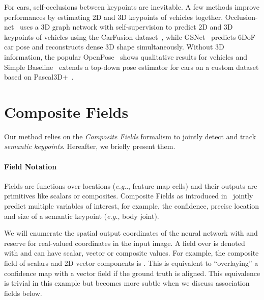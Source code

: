 \documentclass[journal]{IEEEtran}
\makeatletter
\DeclareRobustCommand\onedot{\futurelet\@let@token\@onedot}
\def\@onedot{\ifx\@let@token.\else.\null\fi\xspace}
\def\eg{\emph{e.g}\onedot} \def\Eg{\emph{E.g}\onedot}
\makeatother
\begin{document}
For cars, self-occlusions between keypoints are inevitable. A few
methods improve performances by estimating 2D and 3D keypoints of vehicles
together. Occlusion-net~\cite{reddy2019occlusion} uses a 3D graph network with
self-supervision to predict 2D and 3D keypoints of vehicles using the CarFusion
dataset~\cite{dinesh2018carfusion}, while GSNet~\cite{ke2020gsnet} predicts 6DoF
car pose and reconstructs dense 3D shape simultaneously.  Without 3D information,
the popular OpenPose~\cite{cao2019openpose} shows qualitative results for vehicles
and Simple Baseline~\cite{sanchez2020simple} extends a top-down pose estimator for
cars on a custom dataset based on Pascal3D+~\cite{xiang2014beyond}.





\section{Composite Fields}

Our method relies on the \textit{Composite Fields} formalism to jointly detect and track \textit{semantic keypoints}. Hereafter, we briefly present them.


\paragraph{Field Notation}

Fields are functions over locations (\eg, feature map cells) and their outputs are primitives like scalars or
composites.
Composite Fields as introduced in~\cite{kreiss2019pifpaf} jointly
predict multiple variables of interest, for example, the
confidence, precise location and size of a semantic keypoint (\textit{e.g.}, body joint).

We will enumerate the spatial output coordinates of the neural network with
 and reserve  for real-valued coordinates in the input image.
A field over  is denoted with  and can have
scalar, vector or composite values.
For example, the composite field of scalars  and 2D vector components 
is . This is equivalent to ``overlaying'' a
confidence map with a vector field if the ground truth is aligned. This
equivalence is trivial in this example but becomes more subtle when we
discuss association fields below.
\end{document}
